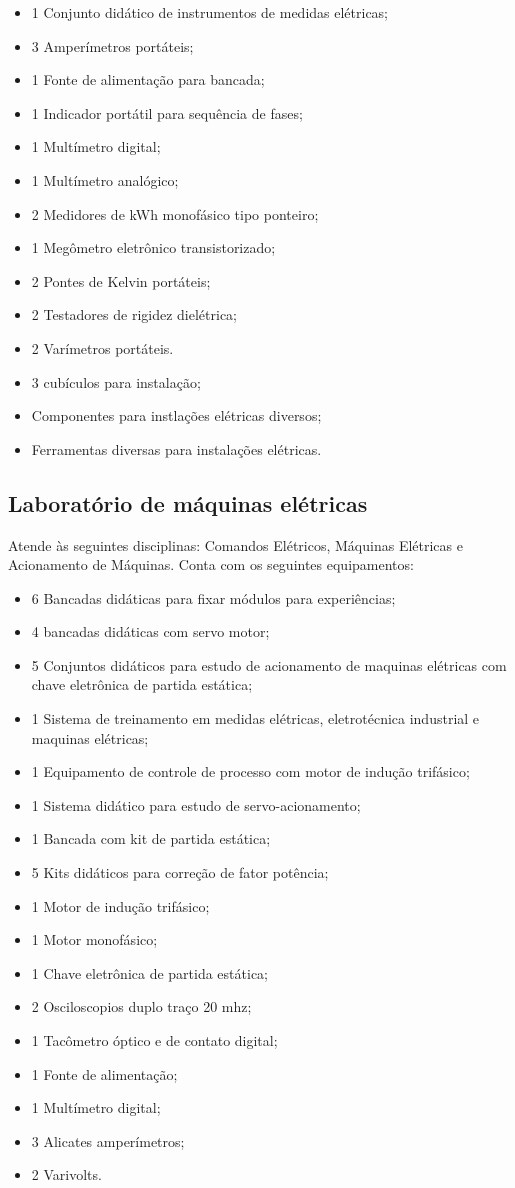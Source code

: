 \begin{itemize}
\item 1 Conjunto didático de instrumentos de medidas elétricas;
\item 3 Amperímetros portáteis;
\item 1 Fonte de alimentação para bancada;
\item 1 Indicador portátil para sequência de fases;
\item 1 Multímetro digital;
\item 1 Multímetro analógico;
\item 2 Medidores de kWh monofásico tipo ponteiro;
\item 1 Megômetro eletrônico transistorizado;
\item 2 Pontes de Kelvin portáteis;
\item 2 Testadores de rigidez dielétrica;
\item 2 Varímetros portáteis.
\item 3 cubículos para instalação;
\item Componentes para instlações elétricas diversos;
\item Ferramentas diversas para instalações elétricas. 
\end{itemize}

\subsection*{Laboratório de máquinas elétricas}
Atende às seguintes disciplinas: Comandos Elétricos, Máquinas Elétricas e Acionamento de Máquinas. Conta com os seguintes equipamentos:

\begin{itemize}
\item 6 Bancadas didáticas para fixar módulos para experiências;
\item 4 bancadas didáticas com servo motor;
\item 5 Conjuntos didáticos para estudo de acionamento de maquinas elétricas com chave eletrônica de partida estática;
\item 1 Sistema de treinamento em medidas elétricas, eletrotécnica industrial e maquinas elétricas;
\item 1 Equipamento de controle de processo com motor de indução trifásico;
\item 1 Sistema didático para estudo de servo-acionamento;
\item 1 Bancada com kit de partida estática;
\item 5 Kits didáticos para correção de fator potência;
\item 1 Motor de indução trifásico;
\item 1 Motor monofásico;
\item 1 Chave eletrônica de partida estática;
\item 2 Osciloscopios duplo traço 20 mhz;
\item 1 Tacômetro óptico e de contato digital;
\item 1 Fonte de alimentação;
\item 1 Multímetro digital;
\item 3 Alicates amperímetros;
\item 2 Varivolts.
\end{itemize}

